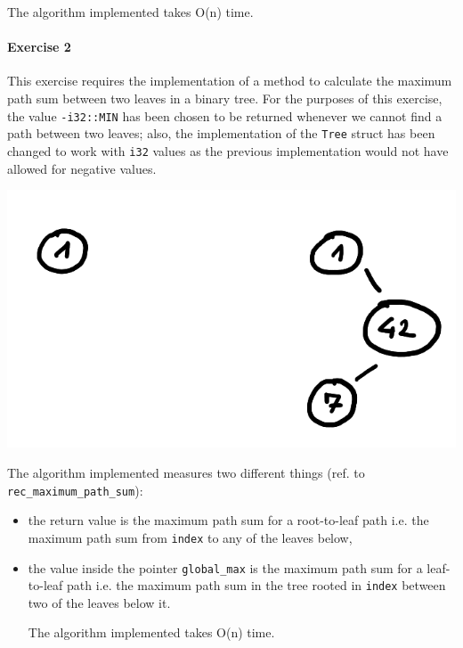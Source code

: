 \documentclass[12pt]{report}
\theoremstyle{definition}
\theoremstyle{definition}
\begin{document}
The algorithm implemented takes O(n) time.
\paragraph*{Exercise 2}
This exercise requires the implementation of a method to calculate the maximum path sum
between two leaves in a binary tree. For the purposes of this exercise,
the value \texttt{-i32::MIN} has been chosen to be returned whenever we cannot find a path
between two leaves; also, the implementation of the \texttt{Tree} struct has been changed
to work with \texttt{i32} values as the previous implementation would not have allowed for
negative values.

\includegraphics[scale=0.35]{images/ex2-trees-no-mps.png}

\pagebreak
The algorithm implemented measures two different things
(ref. to \linebreak \texttt{rec\_maximum\_path\_sum}):
\begin{itemize}
\item the return value is the maximum path sum for a root-to-leaf path i.e. the maximum
path sum from \texttt{index} to any of the leaves below,
\item the value inside the pointer \texttt{global\_max} is the maximum path sum for a
leaf-to-leaf path i.e. the maximum path sum in the tree rooted in \texttt{index}
between two of the leaves below it.


The algorithm implemented takes O(n) time.
\end{itemize}
\end{document}
